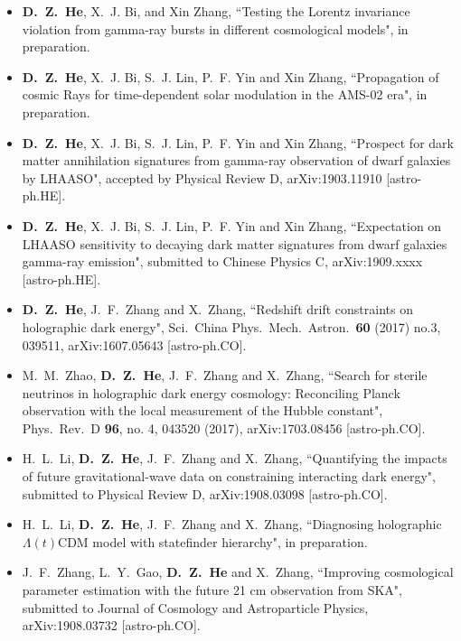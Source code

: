   \begin{itemize}[leftmargin=*]
    \item \textbf{D.~Z.~He}, X.~J. Bi, and Xin Zhang, ``Testing the Lorentz invariance violation from gamma-ray bursts in different cosmological models", in preparation.

    \item \textbf{D.~Z.~He}, X.~J. Bi, S.~J. Lin, P.~F. Yin and Xin Zhang, ``Propagation of cosmic Rays for time-dependent solar modulation in the AMS-02 era", in preparation.
    
    \item \textbf{D.~Z.~He}, X.~J. Bi, S.~J. Lin, P.~F. Yin and Xin Zhang, ``Prospect for dark matter annihilation signatures from gamma-ray observation of dwarf galaxies by LHAASO", accepted by Physical Review D, arXiv:1903.11910 [astro-ph.HE].
    
    \item \textbf{D.~Z.~He}, X.~J. Bi, S.~J. Lin, P.~F. Yin and Xin Zhang, ``Expectation on LHAASO sensitivity to decaying dark matter signatures from dwarf galaxies gamma-ray emission", submitted to Chinese Physics C, arXiv:1909.xxxx [astro-ph.HE].
          
    \item \textbf{D.~Z.~He}, J.~F.~Zhang and X.~Zhang, ``Redshift drift constraints on holographic dark energy", Sci.\ China Phys.\ Mech.\ Astron.\  {\bf 60} (2017) no.3, 039511, arXiv:1607.05643 [astro-ph.CO].   

    \item  M.~M.~Zhao, \textbf{D.~Z.~He}, J.~F.~Zhang and X.~Zhang, ``Search for sterile neutrinos in holographic dark energy cosmology: Reconciling Planck observation with the local measurement of the Hubble constant", Phys.\ Rev.\ D {\bf 96}, no. 4, 043520 (2017), arXiv:1703.08456 [astro-ph.CO].          

    \item H.~L.~Li, \textbf{D.~Z.~He}, J.~F.~Zhang and X.~Zhang, ``Quantifying the impacts of future gravitational-wave data on constraining interacting dark energy", submitted to Physical Review D, arXiv:1908.03098 [astro-ph.CO].

    \item H.~L.~Li, \textbf{D.~Z.~He}, J.~F.~Zhang and X.~Zhang, ``Diagnosing holographic $\Lambda(t)$CDM model with statefinder hierarchy", in preparation.

    \item J.~F.~Zhang, L.~Y.~Gao, \textbf{D.~Z.~He} and X.~Zhang, ``Improving cosmological parameter estimation with the future 21 cm observation from SKA", submitted to Journal of Cosmology and Astroparticle Physics, arXiv:1908.03732 [astro-ph.CO].
     

\end{itemize}
